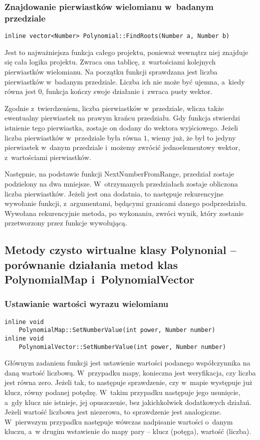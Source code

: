 \subsubsection{Znajdowanie pierwiastków wielomianu w~badanym przedziale}
\begin{lstlisting}
inline vector<Number> Polynomial::FindRoots(Number a, Number b)
\end{lstlisting}

Jest to najważniejsza funkcja całego projektu, ponieważ wewnątrz niej znajduje się cała logika projektu. Zwraca ona tablicę, z~wartościami kolejnych pierwiastków wielomianu. Na początku funkcji sprawdzana jest liczba pierwiastków w~badanym przedziale. Liczba ich nie może być ujemna, a~kiedy równa jest $0$, funkcja kończy swoje działanie i~zwraca pusty wektor.

Zgodnie z~twierdzeniem, liczba pierwiastków w~przedziale, wlicza także ewentualny pierwiastek na prawym krańcu przedziału. Gdy funkcja stwierdzi istnienie tego pierwiastka, zostaje on dodany do wektora wyjściowego. Jeżeli liczba pierwiastków w~przedziale była równa $1$, wiemy już, że był to jedyny pierwiastek w~danym przedziale i~możemy zwrócić jednoelementowy wektor, z~wartościami pierwiastków.

Następnie, na podstawie funkcji NextNumberFromRange, przedział zostaje podzielony na dwa mniejsze. W~otrzymanych przedziałach zostaje obliczona liczba pierwiastków. Jeżeli jest ona dodatnia, to następuje rekurencyjne wywołanie funkcji, z~argumentami, będącymi granicami danego podprzedziału. Wywołana rekurencyjnie metoda, po wykonaniu, zwróci wynik, który zostanie przetworzony przez funkcje wywołującą. 

\subsection{Metody czysto wirtualne klasy Polynonial – porównanie działania metod klas PolynomialMap i~PolynomialVector}

\subsubsection{Ustawianie wartości wyrazu wielomianu}
\begin{lstlisting}
inline void
    PolynomialMap::SetNumberValue(int power, Number number)
inline void
    PolynomialVector::SetNumberValue(int power, Number number)
\end{lstlisting}

Głównym zadaniem funkcji jest ustawienie wartości podanego współczynnika na daną wartość liczbową. W~przypadku mapy, konieczna jest weryfikacja, czy liczba jest równa zero. Jeżeli tak, to następuje sprawdzenie, czy w~mapie występuje już klucz, równy podanej potędzę. W~takim przypadku następuje jego usunięcie, a~gdy klucz nie istnieje, jej opuszczenie, bez jakichkolwiek dodatkowych działań. Jeżeli wartość liczbowa jest niezerowa, to sprawdzenie jest analogiczne. W~pierwszym przypadku następuje wówczas nadpisanie wartości o~danym kluczu, a~w drugim wstawienie do mapy pary – klucz (potęga), wartość (liczba).

